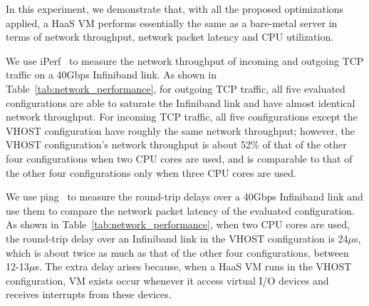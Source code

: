 In this experiment, we demonstrate that, with all  the proposed optimizations applied,  a HaaS VM performs essentially the same as a bare-metal server in terms of network throughput, network packet latency and CPU utilization.



We use  iPerf~\cite{iperf} to measure the network throughput of
incoming and outgoing TCP traffic on a 40Gbps Infiniband link.
As shown in Table~\ref{tab:network_performance}, for outgoing TCP traffic, 
all five evaluated configurations are able to saturate the Infiniband link and 
have almost identical network throughput. 
For incoming TCP  traffic, all five configurations except the VHOST configuration have roughly the same network throughput; however, the VHOST configuration's network throughput 
is about 52\% of that of the other four configurations when two CPU cores are used, and is comparable to that of the other four configurations only when three CPU cores are used. 



We use ping~\cite{ping} to measure the round-trip delays over a 40Gbps Infiniband link and use them to compare the network packet latency of the evaluated configuration. 
As shown in Table~\ref{tab:network_performance}, when two CPU cores are used, the round-trip delay over an Infiniband link in the 
VHOST configuration is 24$\mu$s, which is about twice as much as that of the other four configurations, between 12-13$\mu$s.
The extra delay arises because, when a HaaS VM runs in the VHOST configuration, VM exists occur whenever it access virtual I/O devices and receives interrupts from these devices.





